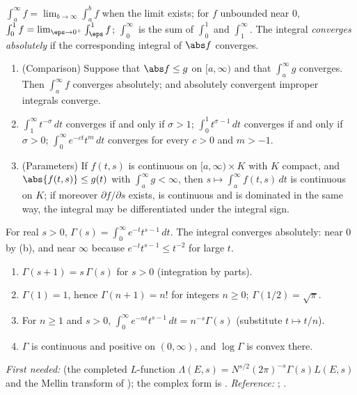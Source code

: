 \begin{definition}\label{def:prereq:improper}
$\int_a^\infty f=\lim_{b\to\infty}\int_a^bf$ when the limit exists; for $f$ unbounded near $0$,
$\int_0^1f=\lim_{\eps\to0^+}\int_\eps^1f$; $\int_0^\infty$ is the sum of $\int_0^1$ and
$\int_1^\infty$. The integral \emph{converges absolutely} if the corresponding integral of $\abs f$
converges.
\end{definition}

\begin{theorem}\label{thm:prereq:improper}
\leavevmode
\begin{enumerate}[label=(\alph*)]
\item (Comparison) Suppose that $\abs f\le g$ on $[a,\infty)$ and that $\int_a^\infty g$ converges. Then
$\int_a^\infty f$ converges absolutely; and absolutely convergent improper integrals converge.
\item $\int_1^\infty t^{-\sigma}\,dt$ converges if and only if $\sigma>1$;
$\int_0^1t^{\sigma-1}\,dt$ converges if and only if $\sigma>0$; $\int_0^\infty e^{-ct}t^m\,dt$
converges for every $c>0$ and $m>-1$.
\item (Parameters) If $f(t,s)$ is continuous on $[a,\infty)\times K$ with $K$ compact, and
$\abs{f(t,s)}\le g(t)$ with $\int_a^\infty g<\infty$, then $s\mapsto\int_a^\infty f(t,s)\,dt$ is
continuous on $K$; if moreover $\partial f/\partial s$ exists, is continuous and is dominated in the
same way, the integral may be differentiated under the integral sign.
\end{enumerate}
\end{theorem}

\begin{definition}\label{def:prereq:gamma}
For real $s>0$, $\Gamma(s)=\int_0^\infty e^{-t}t^{s-1}\,dt$. The integral converges absolutely: near
$0$ by (b), and near $\infty$ because $e^{-t}t^{s-1}\le t^{-2}$ for
large $t$.
\end{definition}

\begin{theorem}\label{thm:prereq:gammareal}
\begin{enumerate}[label=(\alph*)]
\item $\Gamma(s+1)=s\,\Gamma(s)$ for $s>0$ (integration by parts).
\item $\Gamma(1)=1$, hence $\Gamma(n+1)=n!$ for integers $n\ge0$; $\Gamma(1/2)=\sqrt\pi$.
\item For $n\ge1$ and $s>0$, $\int_0^\infty e^{-nt}t^{s-1}\,dt=n^{-s}\Gamma(s)$ (substitute
$t\mapsto t/n$).
\item $\Gamma$ is continuous and positive on $(0,\infty)$, and $\log\Gamma$ is convex there.
\end{enumerate}
\end{theorem}
\noindent\emph{First needed:}  (the completed $L$-function
$\Lambda(E,s)=N^{s/2}(2\pi)^{-s}\Gamma(s)L(E,s)$ and the Mellin transform of
); the complex form is . \emph{Reference:}
\cite[Chapter 8]{Rudin76}; \cite[Chapter 18]{RHB06}.

